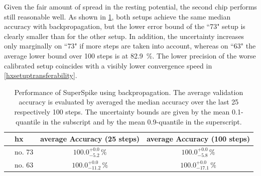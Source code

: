 Given the fair amount of spread in the resting potential, the second chip performs still reasonable well. As shown in \cref{backpropresults}, both setups achieve the same median accuracy with backpropagation, but the lower error bound of the ``73" setup is clearly smaller than for the other setup. In addition, the uncertainty increases only marginally on ``73" if more steps are taken into account, whereas on ``63" the average lower bound over 100 steps is at \SI{82.9}{\%}. The lower precision of the worse calibrated setup coincides with a visibly lower convergence speed in \cref{hxsetuptransferability}. 
\begin{table}[h!]\centering{}
	\begin{tabular}{@{}rlcc@{}}\toprule
		& \gls{hx}& average Accuracy (25 steps)	 & 	average Accuracy (100 steps) \\ \midrule
		& no. 73			& 	 $100.0_{-5.2}^{+0.0}\,\%$ & 	$100.0_{-5.8}^{+0.0}\, \%$\\
		& no. 63			&	$100.0_{-11.2}^{+0.0}\,\%$ &   $100.0_{-17.1}^{+0.0}\, \%$\\
		\bottomrule
	\end{tabular}
	\caption[Performance of SuperSpike using backpropagation.]{Performance of SuperSpike using backpropagation. The average validation accuracy is evaluated by averaged the median accuracy over the last 25 respectively 100 steps. The uncertainty bounds are given by the mean 0.1-quantile in the subscript and by the mean 0.9-quantile in the superscript.}
	\label{backpropresults}
\end{table}

